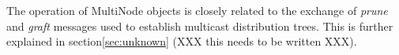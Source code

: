 The operation of MultiNode objects is closely related to
the exchange of {\em prune} and {\em graft} messages used
to establish multicast distribution trees.
This is further explained in section\ref{sec:unknown}
(XXX this needs to be written XXX).


